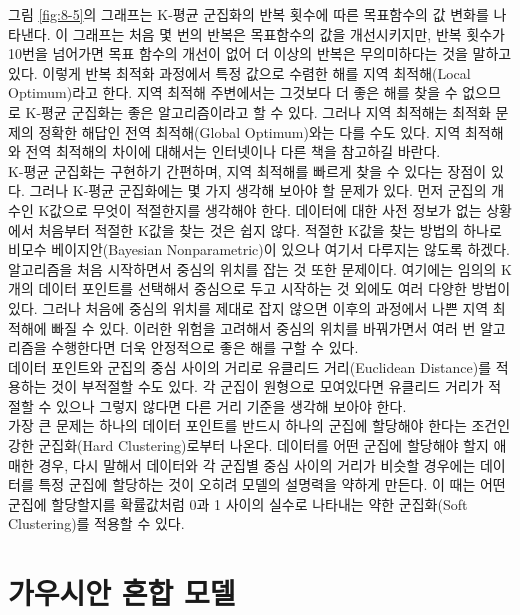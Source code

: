 \documentclass[a4paper]{oblivoir}
\begin{document}
그림 \ref{fig:8-5}의 그래프는 K-평균 군집화의 반복 횟수에 따른 목표함수의 값 변화를 나타낸다. 이 그래프는 처음 몇 번의 반복은 목표함수의 값을 개선시키지만, 반복 횟수가 10번을 넘어가면 목표 함수의 개선이 없어 더 이상의 반복은 무의미하다는 것을 말하고 있다. 이렇게 반복 최적화 과정에서 특정 값으로 수렴한 해를 지역 최적해(Local Optimum)라고 한다. 지역 최적해 주변에서는 그것보다 더 좋은 해를 찾을 수 없으므로 K-평균 군집화는 좋은 알고리즘이라고 할 수 있다. 그러나 지역 최적해는 최적화 문제의 정확한 해답인 전역 최적해(Global Optimum)와는 다를 수도 있다. 지역 최적해와 전역 최적해의 차이에 대해서는 인터넷이나 다른 책을 참고하길 바란다. \\

K-평균 군집화는 구현하기 간편하며, 지역 최적해를 빠르게 찾을 수 있다는 장점이 있다. 그러나 K-평균 군집화에는 몇 가지 생각해 보아야 할 문제가 있다. 먼저 군집의 개수인 K값으로 무엇이 적절한지를 생각해야 한다. 데이터에 대한 사전 정보가 없는 상황에서 처음부터 적절한 K값을   찾는 것은 쉽지 않다. 적절한 K값을 찾는 방법의 하나로 비모수 베이지안(Bayesian Nonparametric)이 있으나 여기서 다루지는 않도록 하겠다. \\

알고리즘을 처음 시작하면서 중심의 위치를 잡는 것 또한 문제이다. 여기에는 임의의 K개의 데이터 포인트를 선택해서 중심으로 두고 시작하는 것 외에도 여러 다양한 방법이 있다. 그러나 처음에 중심의 위치를 제대로 잡지 않으면 이후의 과정에서 나쁜 지역 최적해에 빠질 수 있다. 이러한 위험을 고려해서 중심의 위치를 바꿔가면서 여러 번 알고리즘을 수행한다면 더욱 안정적으로 좋은 해를 구할 수 있다.  \\

데이터 포인트와 군집의 중심 사이의 거리로 유클리드 거리(Euclidean Distance)를 적용하는 것이 부적절할 수도 있다. 각 군집이 원형으로 모여있다면 유클리드 거리가 적절할 수 있으나 그렇지 않다면 다른 거리 기준을 생각해 보아야 한다. \\  

가장 큰 문제는 하나의 데이터 포인트를 반드시 하나의 군집에 할당해야 한다는 조건인 강한 군집화(Hard Clustering)로부터 나온다. 데이터를 어떤 군집에 할당해야 할지 애매한 경우, 다시 말해서 데이터와 각 군집별 중심 사이의 거리가 비슷할 경우에는 데이터를 특정 군집에 할당하는 것이 오히려 모델의 설명력을 약하게 만든다. 이 때는 어떤 군집에 할당할지를 확률값처럼 0과 1 사이의 실수로 나타내는 약한 군집화(Soft Clustering)를 적용할 수 있다.

\section{가우시안 혼합 모델}
\end{document}
